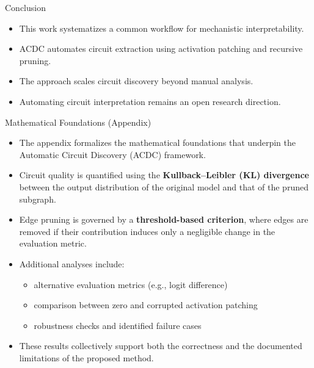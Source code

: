 \documentclass{beamer}
\begin{document}
	\begin{frame}{Conclusion}
		\begin{itemize}
			\justifying
			\item This work systematizes a common workflow
			for mechanistic interpretability.
			
			\item ACDC automates circuit extraction using
			activation patching and recursive pruning.
			
			\item The approach scales circuit discovery
			beyond manual analysis.
			
			\item Automating circuit interpretation
			remains an open research direction.
		\end{itemize}
	\end{frame}
	
	\begin{frame}{Mathematical Foundations (Appendix)}
		\begin{itemize}
			
			\item \justifying
			The appendix formalizes the mathematical foundations that
			underpin the Automatic Circuit Discovery (ACDC) framework.
			
			\item \justifying
			Circuit quality is quantified using the
			\textbf{Kullback--Leibler (KL) divergence} between the output
			distribution of the original model and that of the pruned
			subgraph.
			
			\item \justifying
			Edge pruning is governed by a
			\textbf{threshold-based criterion}, where edges are removed
			if their contribution induces only a negligible change in
			the evaluation metric.
			
			\item \justifying
			Additional analyses include:
			\begin{itemize}
				\item \justifying alternative evaluation metrics (e.g., logit difference)
				\item \justifying comparison between zero and corrupted activation patching
				\item \justifying robustness checks and identified failure cases
			\end{itemize}
			
			\item \justifying
			These results collectively support both the correctness
			and the documented limitations of the proposed method.
		\end{itemize}
	\end{frame}
	
\end{document}
